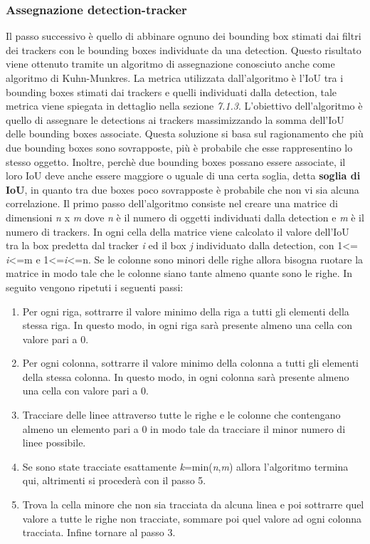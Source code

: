 \subsubsection{Assegnazione detection-tracker}
Il passo successivo è quello di abbinare ognuno dei bounding box stimati dai filtri dei trackers con le bounding boxes individuate da una detection.
Questo risultato viene ottenuto tramite un algoritmo di assegnazione conosciuto anche come algoritmo di Kuhn-Munkres. La metrica utilizzata dall'algoritmo è l'IoU tra i bounding boxes stimati dai trackers e quelli individuati dalla detection, tale metrica viene spiegata in dettaglio nella sezione \textit{7.1.3}. L'obiettivo dell'algoritmo è quello di assegnare le detections ai trackers massimizzando la somma dell'IoU delle bounding boxes associate. Questa soluzione si basa sul ragionamento che più due bounding boxes sono sovrapposte, più è probabile che esse rappresentino lo stesso oggetto. Inoltre, perchè due bounding boxes possano essere associate, il loro IoU deve anche essere maggiore o uguale di una certa soglia, detta \textbf{soglia di IoU}, in quanto tra due boxes poco sovrapposte è probabile che non vi sia alcuna correlazione.
Il primo passo dell'algoritmo consiste nel creare una matrice di dimensioni \textit{n} x \textit{m} dove \textit{n} è il numero di oggetti individuati dalla detection e \textit{m} è il numero di trackers. In ogni cella della matrice viene calcolato il valore dell'IoU tra la box predetta dal tracker \textit{i} ed il box \textit{j} individuato dalla detection, con 1\textless = \textit{i}\textless =m e 1\textless =\textit{i}\textless =n.
Se le colonne sono minori delle righe allora bisogna ruotare la matrice in modo tale che le colonne siano tante almeno quante sono le righe.
In seguito vengono ripetuti i seguenti passi:
\begin{enumerate}
\item Per ogni riga, sottrarre il valore minimo della riga a tutti gli elementi della stessa riga. In questo modo, in ogni riga sarà presente almeno una cella con valore pari a 0.
\item Per ogni colonna, sottrarre il valore minimo della colonna a tutti gli elementi della stessa colonna. In questo modo, in ogni colonna sarà presente almeno una cella con valore pari a 0.
\item Tracciare delle linee attraverso tutte le righe e le colonne che contengano almeno un elemento pari a 0 in modo tale da tracciare il minor numero di linee possibile.
\item Se sono state tracciate esattamente \textit{k}=min(\textit{n},\textit{m}) allora l'algoritmo termina qui, altrimenti si procederà con il passo 5.
\item Trova la cella minore che non sia tracciata da alcuna linea e poi sottrarre quel valore a tutte le righe non tracciate, sommare poi quel valore ad ogni colonna tracciata. Infine tornare al passo 3.
\end{enumerate} 

